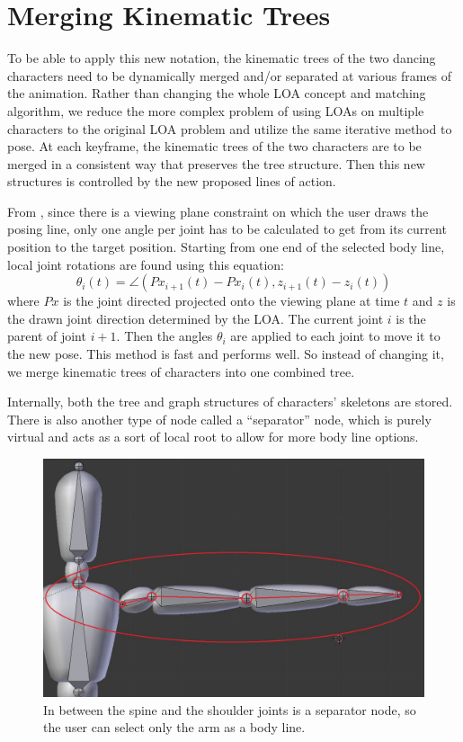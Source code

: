 \newpage

\section{Merging Kinematic Trees}
To be able to apply this new notation, the kinematic trees of the two dancing characters need to be dynamically merged and/or separated at various frames of the animation. Rather than changing the whole LOA concept and matching algorithm, we reduce the more complex problem of using LOAs on multiple characters to the original LOA problem and utilize the same iterative method to pose. At each keyframe, the kinematic trees of the two characters are to be merged in a consistent way that preserves the tree structure. Then this new structures is controlled by the new proposed lines of action.

From \citep{guay2015space}, since there is a viewing plane constraint on which the user draws the posing line, only one angle per joint has to be calculated to get from its current position to the target position. Starting from one end of the selected body line, local joint rotations are found using this equation:
\begin{equation}\label{eq:matching}
\theta_i(t) = \angle (Px_{i+1}(t) - Px_i(t), z_{i+1}(t) - z_i(t)) 
\end{equation}
where $Px$ is the joint directed projected onto the viewing plane at time $t$ and $z$ is the drawn joint direction determined by the LOA. The current joint $i$ is the parent of joint $i+1$. Then the angles $\theta_i$ are applied to each joint to move it to the new pose. This method is fast and performs well. So instead of changing it, we merge kinematic trees of characters into one combined tree. 

Internally, both the tree and graph structures of characters' skeletons are stored. There is also another type of node called a ``separator'' node, which is purely virtual and acts as a sort of local root to allow for more body line options.

\begin{figure}[H]
\centering
\includegraphics[scale=0.3]{img/shoulder}
\caption{In between the spine and the shoulder joints is a separator node, so the user can select only the arm as a body line.}
\end{figure}

